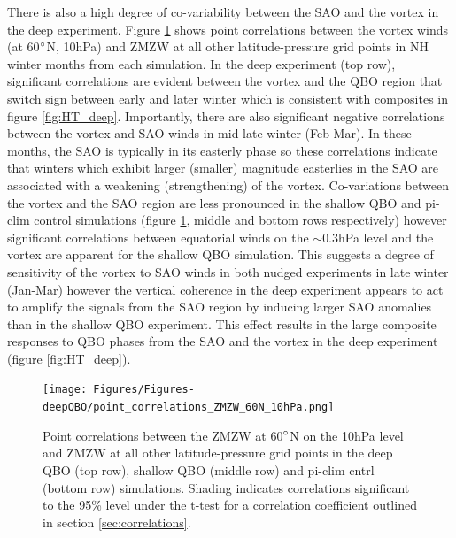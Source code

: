 There is also a high degree of co-variability between the SAO and the vortex in the deep experiment. Figure \ref{fig:point_cors} shows point correlations between the vortex winds (at 60$\degree$N, 10hPa) and ZMZW at all other latitude-pressure grid points in NH winter months from each simulation. In the deep experiment (top row), significant correlations are evident between the vortex and the QBO region that switch sign between early and later winter which is consistent with composites in figure \ref{fig:HT_deep}. Importantly, there are also significant negative correlations between the vortex and SAO winds in mid-late winter (Feb-Mar). In these months, the SAO is typically in its easterly phase so these correlations indicate that winters which exhibit larger (smaller) magnitude easterlies in the SAO are associated with a weakening (strengthening) of the vortex. Co-variations between the vortex and the SAO region are less pronounced in the shallow QBO and pi-clim control simulations (figure \ref{fig:point_cors}, middle and bottom rows respectively) however significant correlations between equatorial winds on the $\sim$0.3hPa level and the vortex are apparent for the shallow QBO simulation. This suggests a degree of sensitivity of the vortex to SAO winds in both nudged experiments in late winter (Jan-Mar) however the vertical coherence in the deep experiment appears to act to amplify the signals from the SAO region by inducing larger SAO anomalies than in the shallow QBO experiment. This effect results in the large composite responses to QBO phases from the SAO and the vortex in the deep experiment (figure \ref{fig:HT_deep}).

\begin{figure}[h!]
\begin{center}
\noindent\texttt{[image: Figures/Figures-deepQBO/point\_correlations\_ZMZW\_60N\_10hPa.png]}
\caption[Point correlations between vortex ZMZWs and winds at other points in QBO experiments]{Point correlations between the ZMZW at 60$\degree$N on the 10hPa level and ZMZW at all other latitude-pressure grid points in the deep QBO (top row), shallow QBO (middle row) and pi-clim cntrl (bottom row) simulations. Shading indicates correlations significant to the 95\% level under the t-test for a correlation coefficient outlined in section \ref{sec:correlations}.}
\label{fig:point_cors}
\end{center}
\end{figure}

